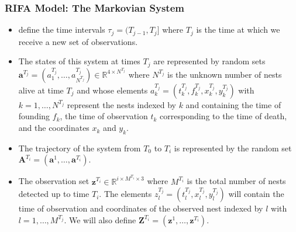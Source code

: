 \documentclass[9pt, xcolor={dvipsnames,svgnames,table}]{beamer}
\begin{document}
    
\begin{frame}
    \frametitle{RIFA Model: The Markovian System}
    \begin{itemize}
        \item define the \textcolor{PineGreen}{time intervals} $\tau_j = (T_{j-1}, T_j]$ where $T_j$ is the time at which we receive a new set of observations.
        \item \textcolor{PineGreen}{The states of this system} at times $T_j$ are represented by random sets $\bm{a}^{T_j} = (a^{T_j}_1, \dots, a^{T_j}_{N^{T_j}}) \in \mathbb{R}^{4\times N^{T_j}}$ where $N^{T_j}$ is the unknown number of nests alive at time $T_j$ and whose elements $a^{T_j}_k = (t_k^{T_j}, f_k^{T_j}, x_k^{T_j}, y_k^{T_j})$ with $k = 1, \dots , N^{T_j}$ represent the nests indexed by $k$ and containing \textcolor{PineGreen}{the time of founding $f_k$, the time of observation $t_k$ corresponding to the time of death, and the coordinates $x_k$ and $y_k$}.
        \item \textcolor{PineGreen}{The trajectory of the system} from $T_0$ to $T_i$ is represented by the random set $\bm{A}^{T_i} = (\bm{a}^1, \dots, \bm{a}^{T_i})$.
        \item \textcolor{PineGreen}{The observation set} $\bm{z}^{T_i} \in \mathbb{R}^{i \times M^{T_i} \times 3}$ where $M^{T_i}$ is the total number of nests detected up to time $T_i$. The elements $z^{T_j}_l = (t^{T_j}_l, x^{T_j}_l, y^{T_j}_l)$ will contain the time of observation and coordinates of the observed nest indexed by $l$ with $l = 1, \dots, M^{T_j}$. We will also define $\bm{Z}^{T_i} = (\bm{z}^1, \dots, \bm{z}^{T_i})$.
    \end{itemize}
\end{frame}
    

    
 
\end{document}
